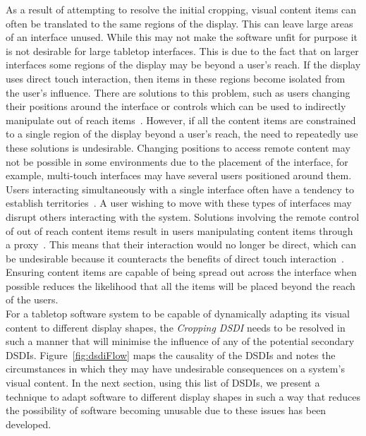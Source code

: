 \documentclass[twocolumn,compsoc]{cvm}
\begin{document}
As a result of attempting to resolve the initial cropping, visual content items can often be translated to the same regions of the display.
This can leave large areas of an interface unused.
While this may not make the software unfit for purpose it is not desirable for large tabletop interfaces.
This is due to the fact that on larger interfaces some regions of the display may be beyond a user's reach.
If the display uses direct touch interaction, then items in these regions become isolated from the user's influence.
There are solutions to this problem, such as users changing their positions around the interface or controls which can be used to indirectly manipulate out of reach items~\cite{Ryall2006a}.
However, if all the content items are constrained to a single region of the display beyond a user's reach, the need to repeatedly use these solutions is undesirable.
Changing positions to access remote content may not be possible in some environments due to the placement of the interface, for example, multi-touch interfaces may have several users positioned around them.
Users interacting simultaneously with a single interface often have a tendency to establish territories~\cite{scott2004}.
A user wishing to move with these types of interfaces may disrupt others interacting with the system.
Solutions involving the remote control of out of reach content items result in users manipulating content items through a proxy~\cite{Smith11}.
This means that their interaction would no longer be direct, which can be undesirable because it counteracts the benefits of direct touch interaction~\cite{Schoning2008}.
Ensuring content items are capable of being spread out across the interface when possible reduces the likelihood that all the items will be placed beyond the reach of the users.\\

For a tabletop software system to be capable of dynamically adapting its visual content to different display shapes, the {\emph{Cropping \ac{DSDI}}} needs to be resolved in such a manner that will minimise the influence of any of the potential secondary \acp{DSDI}.
Figure~\ref{fig:dsdiFlow} maps the causality of the \acp{DSDI} and notes the circumstances in which they may have undesirable consequences on a system's visual content.
In the next section, using this list of \acp{DSDI}, we present a technique to adapt software to different display shapes in such a way that reduces the possibility of software becoming unusable due to these issues has been developed.

\end{document}
